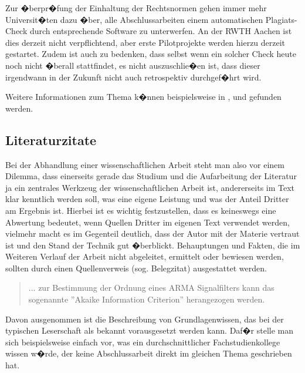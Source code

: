 Zur �berpr�fung der Einhaltung der Rechtsnormen gehen immer mehr Universit�ten dazu �ber, alle Abschlussarbeiten einem automatischen Plagiats-Check durch entsprechende Software zu unterwerfen. An der RWTH Aachen ist dies derzeit nicht verpflichtend, aber erste Pilotprojekte werden hierzu derzeit gestartet. Zudem ist auch zu bedenken, dass selbst wenn ein solcher Check heute noch nicht �berall stattfindet, es nicht auszuschlie�en ist, dass dieser irgendwann in der Zukunft nicht auch retrospektiv durchgef�hrt wird.

Weitere Informationen zum Thema k�nnen beispielsweise in \cite{DFG_richtlinie}, \cite{Uni_Wien} und \cite{Unijournal06_4} gefunden werden.


\subsection{Literaturzitate}
Bei der Abhandlung einer wissenschaftlichen Arbeit steht man also vor einem Dilemma, dass einerseits gerade das Studium und die Aufarbeitung der Literatur ja ein zentrales Werkzeug der wissenschaftlichen Arbeit ist, andererseits im Text klar kenntlich werden soll, was eine eigene Leistung und was der Anteil Dritter am Ergebnis ist. Hierbei ist es wichtig festzustellen, dass es keineswegs eine Abwertung bedeutet, wenn Quellen Dritter im eigenen Text verwendet werden, vielmehr macht es im Gegenteil deutlich, dass der Autor mit der Materie vertraut ist und den Stand der Technik gut �berblickt. Behauptungen und Fakten, die im Weiteren Verlauf der Arbeit nicht abgeleitet, ermittelt oder bewiesen werden, sollten durch einen Quellenverweis (sog. Belegzitat) ausgestattet werden.

\begin{quote}
... zur Bestimmung der Ordnung eines ARMA Signalfilters kann das sogenannte ''Akaike Information Criterion'' \cite{Akaike1974a} herangezogen werden.
\end{quote}

Davon ausgenommen ist die Beschreibung von Grundlagenwissen, das bei der typischen Leserschaft als bekannt vorausgesetzt werden kann. Daf�r stelle man sich beispielsweise einfach vor, was ein durchschnittlicher Fachstudienkollege wissen w�rde, der keine Abschlussarbeit direkt im gleichen Thema geschrieben hat.

